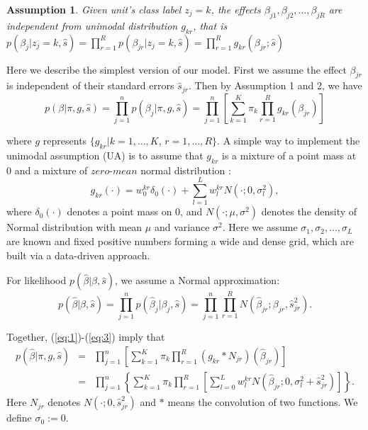 \documentclass[11pt]{article}
\newtheorem{assumption}{Assumption}
\begin{document}
\begin{assumption}Given unit's class label $z_j=k$, the effects $\beta_{j1},\beta_{j2},\ldots,\beta_{jR}$ are independent from unimodal distribution $g_{kr}$, that is $p(\beta_{j}|z_j =k,\hat s)=\prod_{r=1}^R p(\beta_{jr}|z_j =k,\hat s)=\prod_{r=1}^Rg_{kr}( \beta_{jr};\hat s)$
\end{assumption}


Here we describe the simplest version of our model. First we assume the effect $\beta_{jr}$ is independent of their standard errors $\hat s_{jr}$. Then by Assumption 1 and 2, we have
\begin{equation}
p(\beta|\pi,g,\hat s) = \prod_{j=1}^np(\beta_j|\pi,g,\hat s) = \prod_{j=1}^n \left [\sum_{k=1}^K\pi_k\prod_{r=1}^R  g_{kr}(\beta_{jr})\right ]
\label{eq:1}
\end{equation}

where $g$ represents $\{g_{kr}|k = 1,\ldots,K$, $r=1,\ldots,R\}$. A simple way to implement the unimodal assumption (UA) is to assume that $g_{kr}$ is a mixture of a point mass at 0 and a mixture of $zero$-$mean$ normal distribution \cite{ash}:
\begin{equation}
g_{kr}(\cdot) =  w_0^{kr}\delta_0(\cdot)+\sum_{l=1}^L w_l^{kr}N(\cdot;0,\sigma_l^2),
\label{eq:2}
\end{equation}
where $\delta_0(\cdot)$ denotes a point mass on 0, and $N(\cdot;\mu,\sigma^2)$ denotes the density of Normal distribution with mean $\mu$ and variance $\sigma^2$. Here we assume  $\sigma_1,\sigma_2,\ldots,\sigma_L$ are known and fixed positive numbers forming a wide and dense grid, which are built via a data-driven approach.

For likelihood $p(\hat \beta|\beta,\hat s)$, we assume a Normal approximation:
\begin{equation}
p(\hat \beta|\beta,\hat s) = \prod_{j=1}^np(\hat \beta_j|\beta_j,\hat s) = \prod_{j=1}^n\prod_{r=1}^RN(\hat\beta_{jr};\beta_{jr},\hat s_{jr}^2).
\label{eq:3}
\end{equation}

Together, (\ref{eq:1})-(\ref{eq:3}) imply that 
\begin{eqnarray}
p(\hat\beta|\pi,g,\hat s) &=& \prod_{j=1}^n\left[\sum_{k=1}^K\pi_k\prod_{r=1}^R(g_{kr}*N_{jr})(\hat\beta_{jr})\right] \nonumber \\ 
&=& \prod_{j=1}^n\left\{\sum_{k=1}^K\pi_k\prod_{r=1}^R\left[ \sum_{l=0}^Lw_l^{kr}N(\hat\beta_{jr};0,\sigma_l^2+\hat s_{jr}^2)\right]\right\}.
\label{eq:4}
\end{eqnarray}
Here $N_{jr}$ denotes $N(\cdot;0,\hat s_{jr}^2)$ and $*$ means the convolution of two functions. We define $\sigma_0:=0$.
\end{document}
